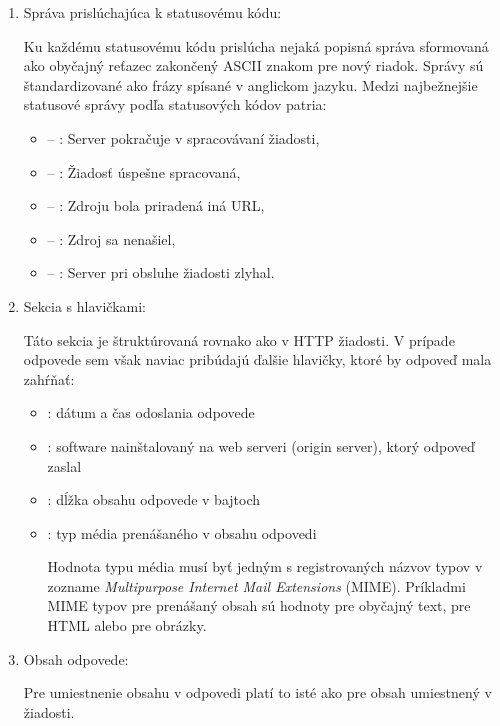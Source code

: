 \begin{enumerate}
    \item Správa prislúchajúca k statusovému kódu:

    Ku každému statusovému kódu prislúcha nejaká popisná správa sformovaná ako obyčajný reťazec zakončený ASCII znakom pre nový riadok. Správy sú štandardizované ako frázy spísané v anglickom jazyku.
    Medzi najbežnejšie statusové správy podľa statusových kódov patria:

    \begin{itemize}
        \item {} -- : Server pokračuje v spracovávaní žiadosti,
        \item {} -- : Žiadosť úspešne spracovaná,
        \item {} -- : Zdroju bola priradená iná URL,
        \item {} -- : Zdroj sa nenašiel,
        \item {} -- : Server pri obsluhe žiadosti zlyhal.
    \end{itemize}

    \pagebreak

    \item Sekcia s hlavičkami:

    Táto sekcia je štruktúrovaná rovnako ako v HTTP žiadosti. V prípade odpovede sem však naviac pribúdajú ďalšie hlavičky, ktoré by odpoveď mala zahŕňať: 

    \begin{itemize}
        \item {}: dátum a čas odoslania odpovede
        \item {}: software nainštalovaný na web serveri (origin server), ktorý odpoveď zaslal
        \item {}: dĺžka obsahu odpovede v bajtoch
        \item {}: typ média prenášaného v obsahu odpovedi

        Hodnota typu média musí byť jedným s registrovaných názvov typov v zozname \textit{Multipurpose Internet Mail Extensions} (MIME). Príkladmi MIME typov pre prenášaný obsah sú hodnoty  pre obyčajný text,  pre HTML alebo  pre obrázky.
    \end{itemize}

    \item Obsah odpovede:

    Pre umiestnenie obsahu v odpovedi platí to isté ako pre obsah umiestnený v žiadosti.
\end{enumerate}


